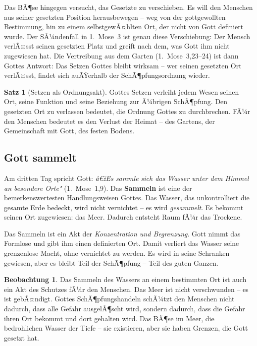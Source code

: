 ﻿\documentclass[a4paper,12pt]{article}
\theoremstyle{definition}
\newtheorem{theorem}{Satz}[section]
\newtheorem{observation}{Beobachtung}[section]
\begin{document}
Das BÃ¶se hingegen versucht, das Gesetzte zu verschieben. Es will den Menschen
aus seiner gesetzten Position herausbewegen -- weg von der gottgewollten
Bestimmung, hin zu einem selbstgewÃ¤hlten Ort, der nicht von Gott definiert wurde.
Der SÃ¼ndenfall in 1.~Mose~3 ist genau diese Verschiebung: Der Mensch verlÃ¤sst
seinen gesetzten Platz und greift nach dem, was Gott ihm nicht zugewiesen hat.
Die Vertreibung aus dem Garten (1.~Mose~3,23--24) ist dann Gottes Antwort: Das
Setzen Gottes bleibt wirksam -- wer seinen gesetzten Ort verlÃ¤sst, findet sich
auÃŸerhalb der SchÃ¶pfungsordnung wieder.

\begin{theorem}[Setzen als Ordnungsakt]
	Gottes Setzen verleiht jedem Wesen seinen Ort, seine Funktion und seine
	Beziehung zur Ã¼brigen SchÃ¶pfung. Den gesetzten Ort zu verlassen bedeutet,
	die Ordnung Gottes zu durchbrechen. FÃ¼r den Menschen bedeutet es den Verlust
	der Heimat -- des Gartens, der Gemeinschaft mit Gott, des festen Bodens.
\end{theorem}

\subsection{Gott sammelt}

Am dritten Tag spricht Gott: \textit{â€žEs sammle sich das Wasser unter dem Himmel
	an besondere Orte"} (1.~Mose~1,9). Das \textbf{Sammeln} ist eine der
bemerkenswertesten Handlungsweisen Gottes. Das Wasser, das unkontrolliert die
gesamte Erde bedeckt, wird nicht vernichtet -- es wird \textit{gesammelt}. Es
bekommt seinen Ort zugewiesen: das Meer. Dadurch entsteht Raum fÃ¼r das Trockene.

Das Sammeln ist ein Akt der \textit{Konzentration und Begrenzung}. Gott nimmt
das Formlose und gibt ihm einen definierten Ort. Damit verliert das Wasser seine
grenzenlose Macht, ohne vernichtet zu werden. Es wird in seine Schranken gewiesen,
aber es bleibt Teil der SchÃ¶pfung -- Teil des guten Ganzen.

\begin{observation}
	Das Sammeln des Wassers an einem bestimmten Ort ist auch ein Akt des Schutzes
	fÃ¼r den Menschen. Das Meer ist nicht verschwunden -- es ist gebÃ¤ndigt. Gottes
	SchÃ¶pfungshandeln schÃ¼tzt den Menschen nicht dadurch, dass alle Gefahr
	ausgelÃ¶scht wird, sondern dadurch, dass die Gefahr ihren Ort bekommt und dort
	gehalten wird. Das BÃ¶se im Meer, die bedrohlichen Wasser der Tiefe -- sie
	existieren, aber sie haben Grenzen, die Gott gesetzt hat.
\end{observation}
\end{document}
